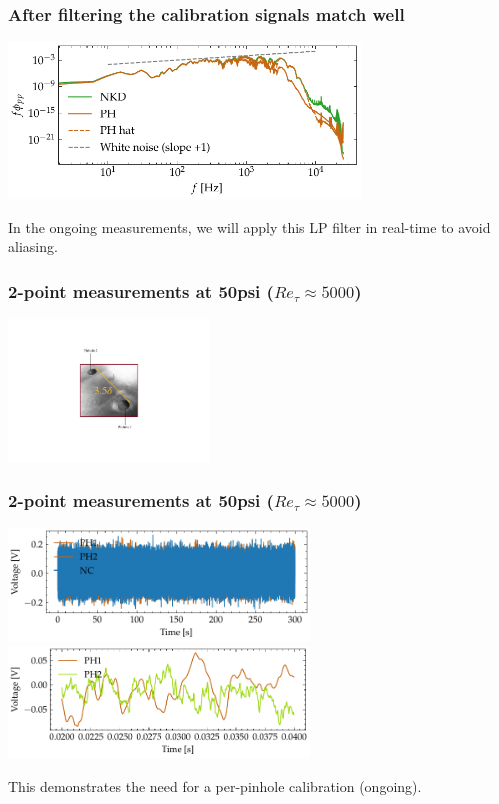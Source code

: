 \documentclass[aspectratio=169,9pt]{beamer}
\begin{document}
\begin{frame}
    \frametitle{After filtering the calibration signals match well}
        \centering
        \includegraphics[width=0.7\textwidth]{sanity/50psi/PH-NKD/calib_spectra_50psi_nn_filt_recon.pdf}

        \centering
        In the ongoing measurements, we will apply this LP filter in real-time to avoid aliasing.
\end{frame}

\begin{frame}
    \frametitle{2-point measurements at 50psi ($Re_\tau\approx 5000$)}
        \centering
        \includegraphics[width=0.4\textwidth]{sanity/50psi/03_10/pinholefig.pdf}

\end{frame}

\begin{frame}
    \frametitle{2-point measurements at 50psi ($Re_\tau\approx 5000$)}
        \centering
        \includegraphics[width=0.6\textwidth]{sanity/50psi/03_10/calib_ts_signals_50psi.pdf}
        \includegraphics[width=0.6\textwidth]{sanity/50psi/03_10/calib_ts_signals_50psi_part.pdf}

        \centering
        This demonstrates the need for a per-pinhole calibration (ongoing).
\end{frame}
\end{document}
